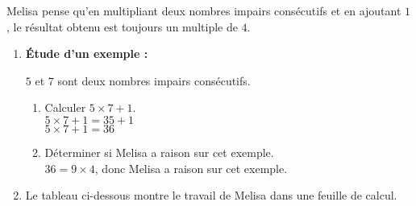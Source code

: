 \begin{corrige}
    Melisa pense qu'en multipliant deux nombres impairs consécutifs et en ajoutant $1$, le résultat obtenu est toujours un multiple de $4$.

    \begin{enumerate}
        \item {\bfseries Étude d'un exemple : }
        
        $5$ et $7$ sont deux nombres impairs consécutifs.
        \begin{enumerate}
            \item Calculer $5\times 7 + 1$.\\
            {\red $5\times 7 + 1 = 35+1$\\$5\times 7 + 1 = 36$}\\
            \item Déterminer si Melisa a raison sur cet exemple.\\
            {\red $36 = 9\times 4$, donc Melisa a raison sur cet exemple.}\\
        \end{enumerate}
        \setcounter{enumi}{1}
        \item \tableurLogo Le tableau ci-dessous montre le travail de Melisa dans une feuille de calcul.
        

\end{enumerate}
\end{corrige}
